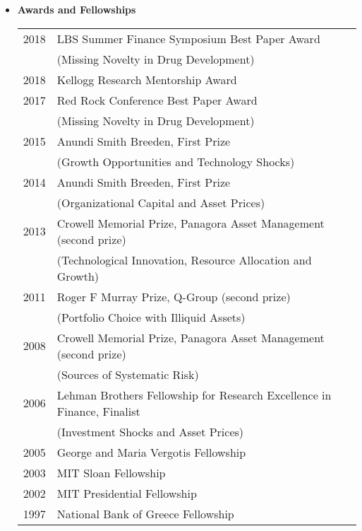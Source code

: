 \documentclass[11pt,letterpaper,serif,overlapped]{res}
\begin{document}
\begin{resume}
\begin{itemize}
\item \textbf{Awards and Fellowships}\\
\begin{longtable}{ll}
2018 & LBS  Summer Finance Symposium Best Paper Award \\ &  (Missing Novelty in Drug Development)\\
2018 & Kellogg Research Mentorship Award\\
2017 & Red Rock Conference Best Paper Award \\ &  (Missing Novelty in Drug Development)\\
2015 & Anundi Smith Breeden, First Prize\\ &  (Growth Opportunities and Technology Shocks)\\
2014 & Anundi Smith Breeden, First Prize \\ & (Organizational Capital and Asset Prices)\\
2013 & Crowell Memorial Prize, Panagora Asset Management (second prize)\\& (Technological Innovation, Resource Allocation and Growth)\\
2011 & Roger F Murray Prize, Q-Group (second prize)\\ & (Portfolio Choice with Illiquid Assets)\\
2008 & Crowell Memorial Prize, Panagora Asset Management (second prize) \\ & (Sources of Systematic Risk) \\
2006  & Lehman Brothers Fellowship for Research Excellence in Finance, Finalist\\ & (Investment Shocks and Asset Prices)\\
2005 & George and Maria Vergotis Fellowship\\
2003& MIT Sloan Fellowship\\
2002 & MIT Presidential Fellowship\\
1997 & National Bank of Greece Fellowship \\
\end{longtable}





\vspace{0.5cm}


\end{itemize}
\end{resume}
\end{document}
